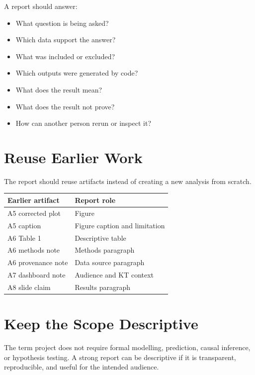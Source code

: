 \documentclass[
  letterpaper,
  DIV=11,
  numbers=noendperiod,
  oneside]{scrreprt}
\providecommand{\tightlist}{%
  \setlength{\itemsep}{0pt}\setlength{\parskip}{0pt}}
\begin{document}
A report should answer:

\begin{itemize}
\tightlist
\item
  What question is being asked?
\item
  Which data support the answer?
\item
  What was included or excluded?
\item
  Which outputs were generated by code?
\item
  What does the result mean?
\item
  What does the result not prove?
\item
  How can another person rerun or inspect it?
\end{itemize}

\section*{Reuse Earlier Work}\label{reuse-earlier-work-1}


The report should reuse artifacts instead of creating a new analysis
from scratch.

\begin{longtable}[]{@{}ll@{}}
\toprule\noalign{}
Earlier artifact & Report role \\
\midrule\noalign{}
\endhead
\bottomrule\noalign{}
\endlastfoot
A5 corrected plot & Figure \\
A5 caption & Figure caption and limitation \\
A6 Table 1 & Descriptive table \\
A6 methods note & Methods paragraph \\
A6 provenance note & Data source paragraph \\
A7 dashboard note & Audience and KT context \\
A8 slide claim & Results paragraph \\
\end{longtable}

\section*{Keep the Scope Descriptive}\label{keep-the-scope-descriptive}


The term project does not require formal modelling, prediction, causal
inference, or hypothesis testing. A strong report can be descriptive if
it is transparent, reproducible, and useful for the intended audience.
\end{document}
